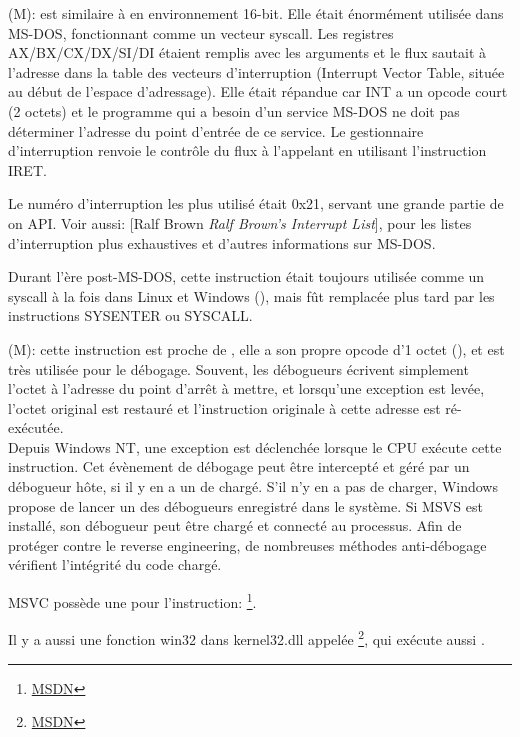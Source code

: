 
\item[INT] (M):  est similaire à 
en environnement 16-bit.
  Elle était énormément utilisée dans MS-DOS, fonctionnant comme un vecteur syscall.
  Les registres AX/BX/CX/DX/SI/DI étaient remplis avec les arguments et le flux sautait
  à l'adresse dans la table des vecteurs d'interruption (Interrupt Vector Table,
  située au début de l'espace d'adressage).
  Elle était répandue car INT a un opcode court (2 octets) et le programme qui a
  besoin d'un service MS-DOS ne doit pas déterminer l'adresse du point d'entrée de
  ce service.
  Le gestionnaire d'interruption renvoie le contrôle du flux à l'appelant en utilisant
  l'instruction IRET.

  Le numéro d'interruption les plus utilisé était 0x21, servant une grande partie
  de on \ac{API}.
  Voir aussi: [Ralf Brown \emph{Ralf Brown's Interrupt List}],
  pour les listes d'interruption plus exhaustives et d'autres informations sur MS-DOS.

  Durant l'ère post-MS-DOS, cette instruction était toujours utilisée comme un syscall
  à la fois dans Linux et Windows (), mais fût remplacée plus tard
  par les instructions SYSENTER ou SYSCALL.

\item[INT 3] (M): cette instruction est proche de
, elle a son propre opcode d'1 octet (),
et est très utilisée pour le débogage.
Souvent, les débogueurs écrivent simplement l'octet  à l'adresse du point
d'arrêt à mettre, et lorsqu'une exception est levée, l'octet original est restauré
et l'instruction originale à cette adresse est ré-exécutée. \\
Depuis \gls{Windows NT}, une exception  est déclenchée
lorsque le \ac{CPU} exécute cette instruction.
Cet évènement de débogage peut être intercepté et géré par un débogueur hôte, si
il y en a un de chargé.
S'il n'y en a pas de charger, Windows propose de lancer un des débogueurs enregistré
dans le système.
Si \ac{MSVS} est installé, son débogueur peut être chargé et connecté au processus.
Afin de protéger contre le \gls{reverse engineering}, de nombreuses méthodes anti-débogage
vérifient l'intégrité du code chargé.

\ac{MSVC} possède une  pour l'instruction:
\footnote{\href{http://msdn.microsoft.com/en-us/library/f408b4et.aspx}{MSDN}}.


Il y a aussi une fonction win32 dans kernel32.dll appelée
\footnote{\href{http://msdn.microsoft.com/en-us/library/windows/desktop/ms679297(v=vs.85).aspx}{MSDN}},
qui exécute aussi .

